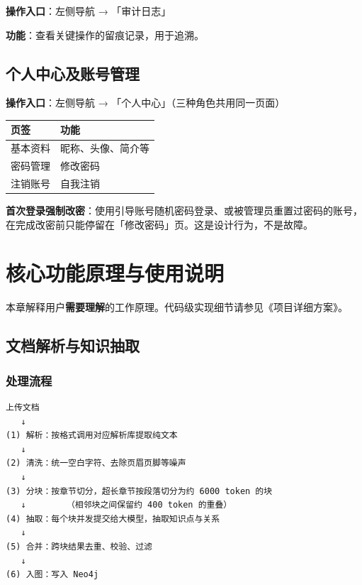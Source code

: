 \documentclass[UTF8,a4paper,11pt]{ctexrep}
\begin{document}
\textbf{操作入口}：左侧导航 → 「审计日志」

\textbf{功能}：查看关键操作的留痕记录，用于追溯。


\section{个人中心及账号管理}

\textbf{操作入口}：左侧导航 → 「个人中心」（三种角色共用同一页面）

\begin{center}
\small
\begin{tabularx}{\linewidth}{@{}XX@{}}
\toprule
页签 & 功能 \\
\midrule
基本资料 & 昵称、头像、简介等 \\
密码管理 & 修改密码 \\
注销账号 & 自我注销 \\
\bottomrule
\end{tabularx}
\end{center}
\textbf{首次登录强制改密}：使用引导账号随机密码登录、或被管理员重置过密码的账号，在完成改密前只能停留在「修改密码」页。这是设计行为，不是故障。


\chapter{核心功能原理与使用说明}

本章解释用户\textbf{需要理解}的工作原理。代码级实现细节请参见《项目详细方案》。


\section{文档解析与知识抽取}


\subsection{处理流程}

\begin{Verbatim}[breaklines=true,breakanywhere=true,fontsize=\small,frame=single,framesep=4pt,rulecolor=\color{codeframe}]
上传文档
   ↓
(1) 解析：按格式调用对应解析库提取纯文本
   ↓
(2) 清洗：统一空白字符、去除页眉页脚等噪声
   ↓
(3) 分块：按章节切分，超长章节按段落切分为约 6000 token 的块
   ↓        （相邻块之间保留约 400 token 的重叠）
(4) 抽取：每个块并发提交给大模型，抽取知识点与关系
   ↓
(5) 合并：跨块结果去重、校验、过滤
   ↓
(6) 入图：写入 Neo4j
\end{Verbatim}
\end{document}
